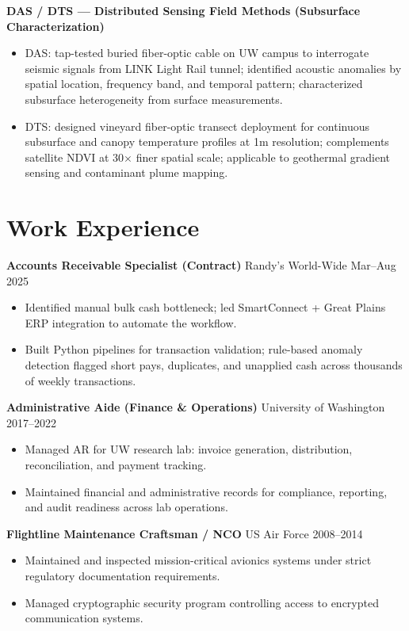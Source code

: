 \documentclass[11pt,a4paper]{article}
\begin{document}
\vspace{0.2cm}
\noindent
\textbf{DAS / DTS --- Distributed Sensing Field Methods (Subsurface Characterization)}
\begin{itemize}
    \item DAS: tap-tested buried fiber-optic cable on UW campus to interrogate seismic signals from LINK Light Rail tunnel; identified acoustic anomalies by spatial location, frequency band, and temporal pattern; characterized subsurface heterogeneity from surface measurements.
    \item DTS: designed vineyard fiber-optic transect deployment for continuous subsurface and canopy temperature profiles at 1m resolution; complements satellite NDVI at 30$\times$ finer spatial scale; applicable to geothermal gradient sensing and contaminant plume mapping.
\end{itemize}

\section*{Work Experience}

\noindent
\textbf{Accounts Receivable Specialist (Contract)} \hfill Randy's World-Wide \hfill Mar--Aug 2025
\begin{itemize}
    \item Identified manual bulk cash bottleneck; led SmartConnect + Great Plains ERP integration to automate the workflow.
    \item Built Python pipelines for transaction validation; rule-based anomaly detection flagged short pays, duplicates, and unapplied cash across thousands of weekly transactions.
\end{itemize}

\vspace{0.2cm}
\noindent
\textbf{Administrative Aide (Finance \& Operations)} \hfill University of Washington \hfill 2017--2022
\begin{itemize}
    \item Managed AR for UW research lab: invoice generation, distribution, reconciliation, and payment tracking.
    \item Maintained financial and administrative records for compliance, reporting, and audit readiness across lab operations.
\end{itemize}

\vspace{0.2cm}
\noindent
\textbf{Flightline Maintenance Craftsman / NCO} \hfill US Air Force \hfill 2008--2014
\begin{itemize}
    \item Maintained and inspected mission-critical avionics systems under strict regulatory documentation requirements.
    \item Managed cryptographic security program controlling access to encrypted communication systems.
\end{itemize}
\end{document}
